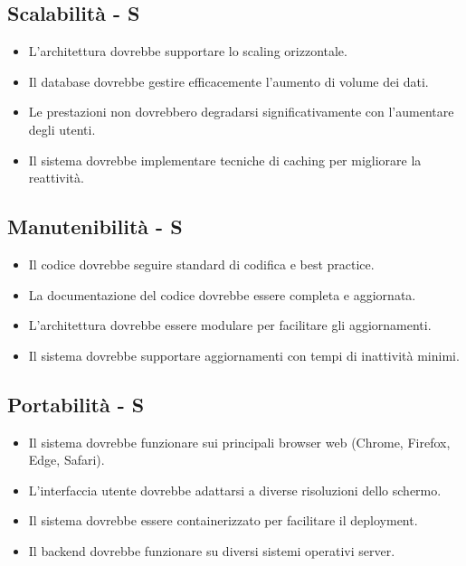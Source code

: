 \documentclass[12pt,a4paper,oneside]{report}
\begin{document}
\subsection{Scalabilità - S}

\begin{itemize}
    \item  L'architettura dovrebbe supportare lo scaling orizzontale.
    \item Il database dovrebbe gestire efficacemente l'aumento di volume dei dati.
    \item Le prestazioni non dovrebbero degradarsi significativamente con l'aumentare degli utenti.
    \item Il sistema dovrebbe implementare tecniche di caching per migliorare la reattività.
\end{itemize}

\subsection{Manutenibilità - S}

\begin{itemize}
    \item Il codice dovrebbe seguire standard di codifica e best practice.
    \item La documentazione del codice dovrebbe essere completa e aggiornata.
    \item L'architettura dovrebbe essere modulare per facilitare gli aggiornamenti.
    \item Il sistema dovrebbe supportare aggiornamenti con tempi di inattività minimi.
\end{itemize}

\subsection{Portabilità - S}

\begin{itemize}
    \item Il sistema dovrebbe funzionare sui principali browser web (Chrome, Firefox, Edge, Safari).
    \item L'interfaccia utente dovrebbe adattarsi a diverse risoluzioni dello schermo.
    \item Il sistema dovrebbe essere containerizzato per facilitare il deployment.
    \item Il backend dovrebbe funzionare su diversi sistemi operativi server.
\end{itemize}
\end{document}
